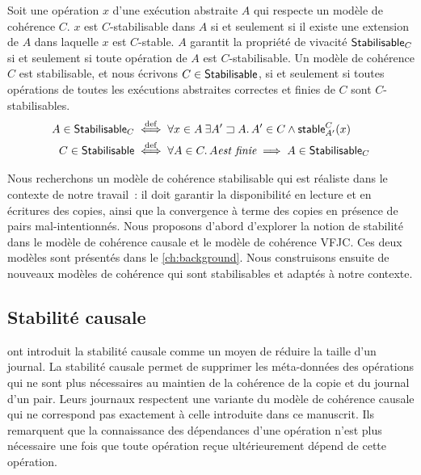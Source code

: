 \begin{definition}\label{def:stabilisable}
Soit une opération $x$ d'une exécution abstraite $A$ qui respecte un modèle de cohérence $C$.
$x$ est $C$-stabilisable dans $A$ si et seulement si il existe une extension de $A$ dans laquelle $x$ est $C$-stable.
$A$ garantit la propriété de vivacité $\operatorname{\mathsf{Stabilisable}}_C$ si et seulement si toute opération de $A$ est $C$-stabilisable.
Un modèle de cohérence $C$ est stabilisable, et nous écrivons $C \in \operatorname{\mathsf{Stabilisable}}$, si et seulement si toutes opérations de toutes les exécutions abstraites correctes et finies de $C$ sont $C$-stabilisables.
\begin{align*}
    A \in \operatorname{\mathsf{Stabilisable}}_C &\overset{\mathrm{def}}{\iff} \forall x \in A \:\exists A' \sqsupset A \ldotp A' \in C \land \operatorname{\mathsf{stable}}_{A'}^C(x)\\
    C \in \operatorname{\mathsf{Stabilisable}} &\overset{\mathrm{def}}{\iff} \forall A \in C \ldotp A \textit{est finie} \implies A \in \operatorname{\mathsf{Stabilisable}}_C
\end{align*}
\end{definition}

Nous recherchons un modèle de cohérence stabilisable qui est réaliste dans le contexte de notre travail~: il doit garantir la disponibilité en lecture et en écritures des copies, ainsi que la convergence à terme des copies en présence de pairs mal-intentionnés.
Nous proposons d'abord d'explorer la notion de stabilité dans le modèle de cohérence causale et le modèle de cohérence \acl{VFJC}.
Ces deux modèles sont présentés dans le \autoref{ch:background}.
Nous construisons ensuite de nouveaux modèles de cohérence qui sont stabilisables et adaptés à notre contexte.


\clearpage %

\subsection{Stabilité causale}\label{subsec:cs}

\textcite{baquero_2018_pure-op-crdt} ont introduit la stabilité causale comme un moyen de réduire la taille d'un journal.
La stabilité causale permet de supprimer les méta-données des opérations qui ne sont plus nécessaires au maintien de la cohérence de la copie et du journal d'un pair.
Leurs journaux respectent une variante du modèle de cohérence causale qui ne correspond pas exactement à celle introduite dans ce manuscrit.
Ils remarquent que la connaissance des dépendances d'une opération n'est plus nécessaire une fois que toute opération reçue ultérieurement dépend de cette opération.

